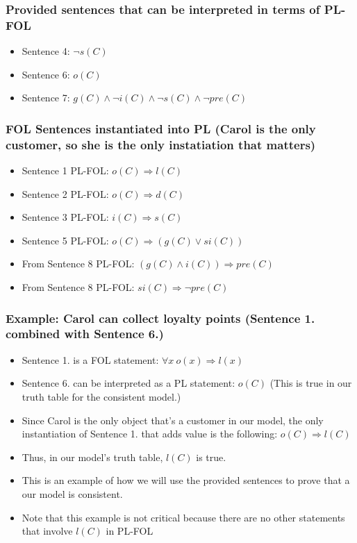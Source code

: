 \documentclass[11pt]{article}
\begin{document}
\subsubsection{Provided sentences that can be interpreted in terms of PL-FOL}
\label{sec:orgbc88176}
\begin{itemize}
\item Sentence 4: \(\lnot s(C)\)
\item Sentence 6: \(o(C)\)
\item Sentence 7: \(g(C) \land \lnot i(C) \land \lnot s(C) \land \lnot pre(C)\)
\end{itemize}
\subsubsection{FOL Sentences instantiated into PL (Carol is the only customer, so she is the only instatiation that matters)}
\label{sec:orgc9617fa}
\begin{itemize}
\item Sentence 1 PL-FOL: \(o(C) \Rightarrow l(C)\)
\item Sentence 2 PL-FOL: \(o(C) \Rightarrow d(C)\)
\item Sentence 3 PL-FOL: \(i(C) \Rightarrow s(C)\)
\item Sentence 5 PL-FOL: \(o(C) \Rightarrow (g(C) \lor si(C))\)
\item From Sentence 8 PL-FOL: \((g(C) \land i(C)) \Rightarrow pre(C)\)
\item From Sentence 8 PL-FOL: \(si(C) \Rightarrow \lnot pre(C)\)
\end{itemize}
\subsubsection{Example: Carol can collect loyalty points (Sentence 1. combined with Sentence 6.)}
\label{sec:org4216395}
\begin{itemize}
\item Sentence 1. is a FOL statement: \(\forall x \: o(x) \Rightarrow l(x)\)
\item Sentence 6. can be interpreted as  a PL statement: \(o(C)\) (This is true in our truth table for the consistent model.)
\item Since Carol is the only object that's a customer in our model, the only instantiation of Sentence 1. that adds value is the following: \(o(C) \Rightarrow l(C)\)
\item Thus, in our model's truth table, \(l(C)\) is true.
\item This is an example of how we will use the provided sentences to prove that a our model is consistent.
\item Note that this example is not critical because there are no other statements that involve \(l(C)\) in PL-FOL
\end{itemize}
\end{document}
